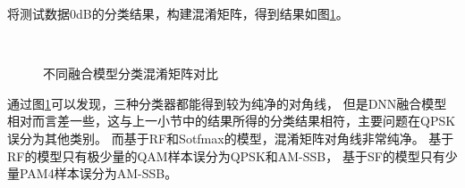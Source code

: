 将测试数据0dB的分类结果，构建混淆矩阵，得到结果如图\ref{sec:fig_4_6}。\par
\begin{figure}[h]
	\centering
	\\
	\caption{不同融合模型分类混淆矩阵对比}
	\label{sec:fig_4_6}
\end{figure}

通过图\ref{sec:fig_4_6}可以发现，三种分类器都能得到较为纯净的对角线，
但是DNN融合模型相对而言差一些，这与上一小节中的结果所得的分类结果相符，主要问题在QPSK误分为其他类别。
而基于RF和Sotfmax的模型，混淆矩阵对角线非常纯净。
基于RF的模型只有极少量的QAM样本误分为QPSK和AM-SSB，
基于SF的模型只有少量PAM4样本误分为AM-SSB。\par

